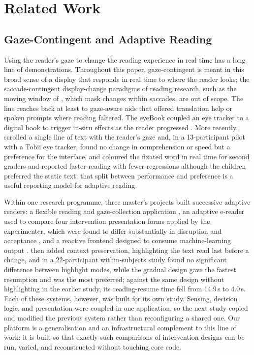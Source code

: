\section{Related Work}
\label{sec:related}

\subsection{Gaze-Contingent and Adaptive Reading}

Using the reader's gaze to change the reading experience in real time has a long line of demonstrations.
Throughout this paper, gaze-contingent is meant in this broad sense of a display that responds in real time to where the reader looks; the saccade-contingent display-change paradigms of reading research, such as the moving window of \citet{mcconkie1975span}, which mask changes within saccades, are out of scope.
The line reaches back at least to gaze-aware aids that offered translation help \cite{hyrskykari2000idict} or spoken prompts \cite{sibert2000reading} where reading faltered.
The eyeBook coupled an eye tracker to a digital book to trigger in-situ effects as the reader progressed \cite{biedert2010eyebook}.
More recently, \citet{medan2024newline} scrolled a single line of text with the reader's gaze and, in a 13-participant pilot with a Tobii eye tracker, found no change in comprehension or speed but a preference for the interface, and \citet{rummens2026highlighting} coloured the fixated word in real time for second graders and reported faster reading with fewer regressions although the children preferred the static text; that split between performance and preference is a useful reporting model for adaptive reading.

Within one research programme, three master's projects built successive adaptive readers: a flexible reading and gaze-collection application \cite{refsgaard2024rtr}, an adaptive e-reader used to compare four intervention presentation forms applied by the experimenter, which were found to differ substantially in disruption and acceptance \cite{pereira2024typography}, and a reactive frontend designed to consume machine-learning output \cite{palinec2024reactive}.
\citet{jensen2025context} then added context preservation, highlighting the text read last before a change, and in a 22-participant within-subjects study found no significant difference between highlight modes, while the gradual design gave the fastest resumption and was the most preferred; against the same design without highlighting in the earlier study, its reading-resume time fell from 14.9\,s to 4.0\,s.
Each of these systems, however, was built for its own study.
Sensing, decision logic, and presentation were coupled in one application, so the next study copied and modified the previous system rather than reconfiguring a shared one.
Our platform is a generalisation and an infrastructural complement to this line of work: it is built so that exactly such comparisons of intervention designs can be run, varied, and reconstructed without touching core code.

